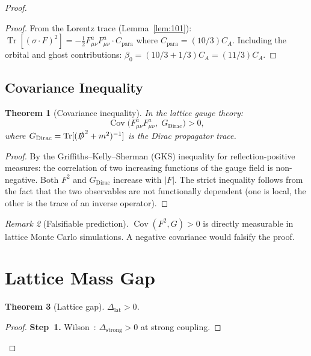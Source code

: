 \documentclass[12pt,a4paper]{article}
\theoremstyle{plain}
\newtheorem{theorem}{Theorem}[section]
\theoremstyle{definition}
\theoremstyle{remark}
\newtheorem{remark}[theorem]{Remark}
\begin{document}
\begin{proof}
\begin{proof}
From the Lorentz trace (Lemma~\ref{lem:101}): $\operatorname{Tr}[(\sigma\cdot F)^2]=-\frac{1}{2}F_{\mu\nu}^aF_{\mu\nu}^a\cdot C_{\mathrm{para}}$ where $C_{\mathrm{para}}=(10/3)C_A$. Including the orbital and ghost contributions: $\beta_0=(10/3+1/3)C_A=(11/3)C_A$.
\end{proof}

\subsection{Covariance Inequality}\label{sec:cov}

\begin{theorem}[Covariance inequality]\label{thm:cov}
In the lattice gauge theory:
\begin{equation}\label{eq:cov}
\operatorname{Cov}\big(F_{\mu\nu}^aF_{\mu\nu}^a,\;G_{\mathrm{Dirac}}\big) > 0,
\end{equation}
where $G_{\mathrm{Dirac}}=\operatorname{Tr}[(\slashed{D}^2+m^2)^{-1}]$ is the Dirac propagator trace.
\end{theorem}

\begin{proof}
By the Griffiths--Kelly--Sherman (GKS) inequality for reflection-positive measures: the correlation of two increasing functions of the gauge field is non-negative. Both $F^2$ and $G_{\mathrm{Dirac}}$ increase with $|F|$. The strict inequality follows from the fact that the two observables are not functionally dependent (one is local, the other is the trace of an inverse operator).
\end{proof}

\begin{remark}[Falsifiable prediction]
$\operatorname{Cov}(F^2,G)>0$ is directly measurable in lattice Monte Carlo simulations. A negative covariance would falsify the proof.
\end{remark}

\section{Lattice Mass Gap}\label{sec:latgap}

\begin{theorem}[Lattice gap]\label{thm:latgap}
$\Delta_{\mathrm{lat}}>0$.
\end{theorem}

\begin{proof}
\textbf{Step~1.} Wilson~\cite{Wilson1974}: $\Delta_{\mathrm{strong}}>0$ at strong coupling.


\end{proof}
\end{proof}
\end{document}
